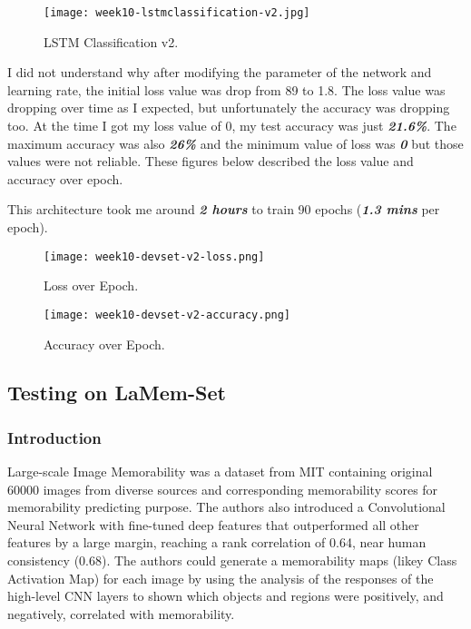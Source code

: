 \begin{figure}[!ht]
\centering
\texttt{[image: week10-lstmclassification-v2.jpg]}
\caption{LSTM Classification v2.}
\end{figure}

\newpage
I did not understand why after modifying the parameter of the network and learning rate, the initial loss value was drop from 89 to 1.8. The loss value was dropping over time as I expected, but unfortunately the accuracy was dropping too. At the time I got my loss value of 0, my test accuracy was just \textbf{\emph{21.6\%}}. The maximum accuracy was also \textbf{\emph{26\%}} and the minimum value of loss was \textbf{\emph{0}} but those values were not reliable. These figures below described the loss value and accuracy over epoch.

This architecture took me around \textbf{\emph{2 hours}} to train 90 epochs (\textbf{\emph{1.3 mins}} per epoch).

\begin{figure}[!ht]
\centering
\texttt{[image: week10-devset-v2-loss.png]}
\caption{Loss over Epoch.}
\end{figure}

\begin{figure}[!ht]
\centering
\texttt{[image: week10-devset-v2-accuracy.png]}
\caption{Accuracy over Epoch.}
\end{figure}

\subsection{Testing on LaMem-Set}
\subsubsection{Introduction}
Large-scale Image Memorability\cite{lamem} was a dataset from MIT containing original 60000 images from diverse sources and corresponding memorability scores for memorability predicting purpose. The authors also introduced a Convolutional Neural Network with fine-tuned deep features that outperformed all other features by a large margin, reaching a rank correlation of 0.64, near human consistency (0.68). The authors could generate a memorability maps (likey Class Activation Map) for each image by using the analysis of the responses of the high-level CNN layers to shown which objects and regions were positively, and negatively, correlated with memorability.

